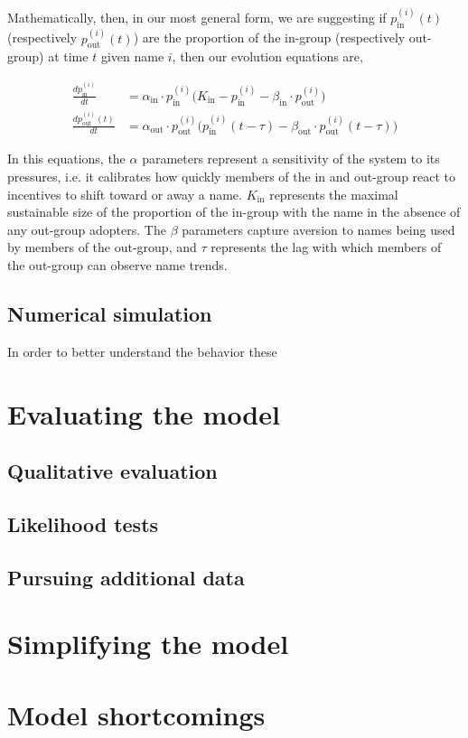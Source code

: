 \documentclass[a4paper]{article}
\begin{document}
Mathematically, then, in our most general form, we are suggesting if
$p_\text{in}^{(i)}{(t)}$ (respectively $p_\text{out}^{(i)}{(t)}$) are the
proportion of the in-group (respectively out-group) at time $t$ given name $i$,
then our evolution equations are,

\begin{align*}
\frac{d p_\text{in}^{(i)}}{dt} &= \alpha_\text{in} \cdot p_\text{in}^{(i)}
\bigg(K_\text{in} - p_\text{in}^{(i)} - \beta_\text{in} \cdot
p_\text{out}^{(i)}\bigg) \\
\frac{d p_\text{out}^{(i)}(t)}{dt} &= \alpha_\text{out} \cdot p_\text{out}^{(i)}
\bigg( p_\text{in}^{(i)}(t-\tau) - \beta_\text{out} \cdot
p_\text{out}^{(i)}(t-\tau) \bigg)
\end{align*}

In this equations, the $\alpha$ parameters represent a sensitivity of the system
to its pressures, i.e. it calibrates how quickly members of the in and out-group
react to incentives to shift toward or away a name. $K_\text{in}$ represents the
maximal sustainable size of the proportion of the in-group with the name in the
absence of any out-group adopters. The $\beta$ parameters capture aversion to
names being used by members of the out-group, and $\tau$ represents the lag with
which members of the out-group can observe name trends.

\subsection{Numerical simulation}

In order to better understand the behavior these 

\section{Evaluating the model}

\subsection{Qualitative evaluation}

\subsection{Likelihood tests}

\subsection{Pursuing additional data}

\section{Simplifying the model}

\section{Model shortcomings}



\end{document}
